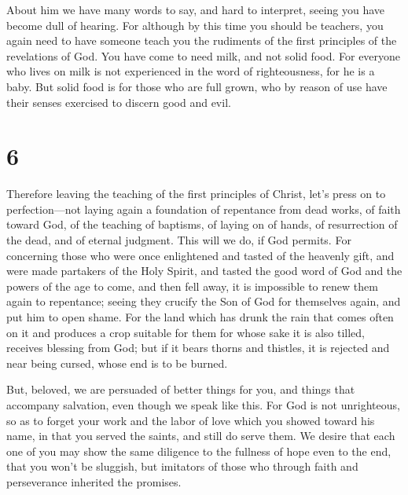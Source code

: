  About him we have many words to say, and hard to
interpret, seeing you have become dull of hearing.  For
although by this time you should be teachers, you again need to have
someone teach you the rudiments of the first principles of the
revelations of God. You have come to need milk, and not solid food.
 For everyone who lives on milk is not experienced in the
word of righteousness, for he is a baby.  But solid food
is for those who are full grown, who by reason of use have their senses
exercised to discern good and evil.

\hypertarget{section-5}{%
\section{6}\label{section-5}}

 Therefore leaving the teaching of the first principles of
Christ, let's press on to perfection---not laying again a foundation of
repentance from dead works, of faith toward God,  of the
teaching of baptisms, of laying on of hands, of resurrection of the
dead, and of eternal judgment.  This will we do, if God
permits.  For concerning those who were once enlightened
and tasted of the heavenly gift, and were made partakers of the Holy
Spirit,  and tasted the good word of God and the powers of
the age to come,  and then fell away, it is impossible to
renew them again to repentance; seeing they crucify the Son of God for
themselves again, and put him to open shame.  For the land
which has drunk the rain that comes often on it and produces a crop
suitable for them for whose sake it is also tilled, receives blessing
from God;  but if it bears thorns and thistles, it is
rejected and near being cursed, whose end is to be burned.

 But, beloved, we are persuaded of better things for you,
and things that accompany salvation, even though we speak like this.
 For God is not unrighteous, so as to forget your work
and the labor of love which you showed toward his name, in that you
served the saints, and still do serve them.  We desire
that each one of you may show the same diligence to the fullness of hope
even to the end,  that you won't be sluggish, but
imitators of those who through faith and perseverance inherited the
promises.


